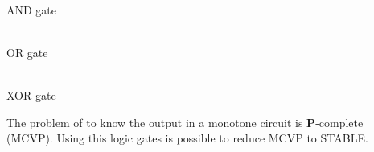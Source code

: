 \documentclass[portrait,final,a0paper,fontscale=0.277]{baposter}
\begin{document}
\begin{poster}
{\begin{center}
  \begin{minipage}[t]{0.325\textwidth}
      \begin{center}
      \begin{tikzpicture}[scale=0.075]
      \end{tikzpicture}\\
      AND gate
      \end{center}
  \end{minipage}    
  \begin{minipage}[t]{0.325\textwidth}
      \begin{center}
      \begin{tikzpicture}[scale=0.075]
      \end{tikzpicture}\\
      OR gate
      \end{center}
  \end{minipage}    
  \begin{minipage}[t]{0.325\textwidth}
      \begin{center}
      \begin{tikzpicture}[scale=0.075]
      \end{tikzpicture}\\
      XOR gate
      \end{center}
  \end{minipage}    
\end{center}
The problem of to know the output in a monotone circuit is {{\bf P}}-complete (MCVP). 
Using this logic gates is possible to reduce MCVP to STABLE.
 }  

\end{poster}
\end{document}
